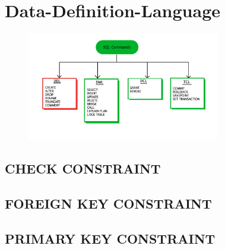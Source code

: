 \section[DDL]{Data-Definition-Language}
\label{sec:ddl}

\begin{figure}[h]
  \centering
  \includegraphics[width=0.75\textwidth]{img//sql-commands-ddl.jpg}
  \label{img:ddl}
\end{figure}

\subsection{CHECK CONSTRAINT}
\label{sec:ddl.check_constraint}

\subsection{FOREIGN KEY CONSTRAINT}
\label{sec:ddl.foreign_key_constraint}

\subsection{PRIMARY KEY CONSTRAINT}
\label{sec:ddl.primary_key_constraint}


